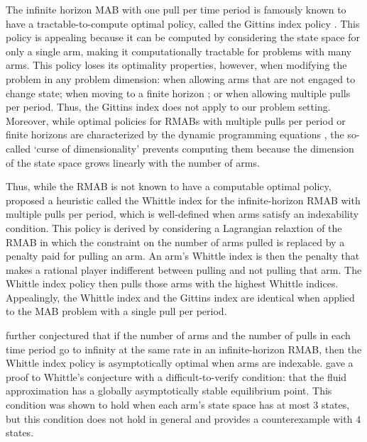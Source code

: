 The infinite horizon MAB with one pull per time period is famously known to have a tractable-to-compute optimal policy, called the Gittins index policy \citep{gittins1979}.  This policy is appealing because it can be computed by considering the state space for only a single arm, making it computationally tractable for problems with many arms.  This policy loses its optimality properties, however, when modifying the problem in any problem dimension: when allowing arms that are not engaged to change state; when moving to a finite horizon \citep{berry1985}; or when allowing multiple pulls per period.  Thus, the Gittins index does not apply to our problem setting.  Moreover, while optimal policies for RMABs with multiple pulls per period or finite horizons are characterized by the dynamic programming equations \citep{putermanBook}, the so-called `curse of dimensionality' \citep{PowellBook} prevents computing them because the dimension of the state space grows linearly with the number of arms.

Thus, while the RMAB is not known to have a computable optimal policy, \cite{whittle1988} proposed a heuristic called the Whittle index for the infinite-horizon RMAB with multiple pulls per period, which is well-defined when arms satisfy an indexability condition.  This policy is derived by considering a Lagrangian relaxtion of the RMAB in which the constraint on the number of arms pulled is replaced by a penalty paid for pulling an arm.  An arm's Whittle index is then the penalty that makes a rational player indifferent between pulling and not pulling that arm.  The Whittle index policy then pulls those arms with the highest Whittle indices.  Appealingly, the Whittle index and the Gittins index are identical when applied to the MAB problem with a single pull per period.  

\cite{whittle1988} further conjectured that if the number of arms and the number of pulls in each time period go to infinity at the same rate in an infinite-horizon RMAB, then the Whittle index policy is asymptotically optimal when arms are indexable. \cite{weber1990,weber1991} gave a proof to Whittle's conjecture with a difficult-to-verify condition: that the fluid approximation has a globally asymptotically stable equilibrium point.  This condition was shown to hold when each arm's state space has at most $3$ states, but this condition does not hold in general and \cite{weber1990} provides a counterexample with $4$ states.

